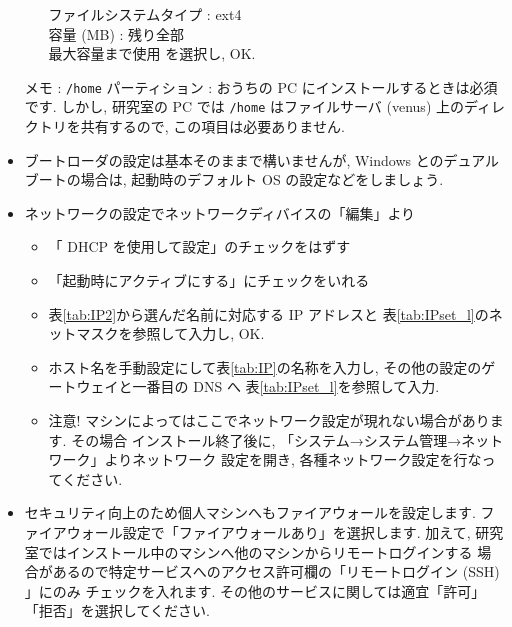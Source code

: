 \documentclass{jarticle}
\begin{document}
\begin{itemize}
\begin{itemize}
			      ファイルシステムタイプ : ext4 \\
			      容量 (MB) : 残り全部 \\
			      最大容量まで使用 を選択し, OK. \\
		\end{itemize}
		メモ : \verb|/home| パーティション : おうちの PC にインストールするときは必須です.
		しかし, 研究室の PC では \verb|/home| はファイルサーバ (venus) 上のディレクトリを共有するので,
		この項目は必要ありません.
	\item ブートローダの設定は基本そのままで構いませんが,
	      Windows とのデュアルブートの場合は,
	      起動時のデフォルト OS の設定などをしましょう.
	\item ネットワークの設定でネットワークディバイスの「編集」より
		\begin{itemize}
			\item 「 DHCP を使用して設定」のチェックをはずす
			\item 「起動時にアクティブにする」にチェックをいれる
			\item 表\ref{tab:IP2}から選んだ名前に対応する IP アドレスと
			      表\ref{tab:IPset_l}のネットマスクを参照して入力し, OK.
			\item ホスト名を手動設定にして表\ref{tab:IP}の名称を入力し,
			      その他の設定のゲートウェイと一番目の DNS へ
			      表\ref{tab:IPset_l}を参照して入力.
			\item 注意! マシンによってはここでネットワーク設定が現れない場合があります. その場合
			      インストール終了後に, 「システム→システム管理→ネットワーク」よりネットワーク
			      設定を開き, 各種ネットワーク設定を行なってください.
		\end{itemize}
	\item セキュリティ向上のため個人マシンへもファイアウォールを設定します.
	      ファイアウォール設定で「ファイアウォールあり」を選択します.
	      加えて, 研究室ではインストール中のマシンへ他のマシンからリモートログインする
	      場合があるので特定サービスへのアクセス許可欄の「リモートログイン (SSH) 」にのみ
	      チェックを入れます. その他のサービスに関しては適宜「許可」「拒否」を選択してください.

\end{itemize}
\end{document}
